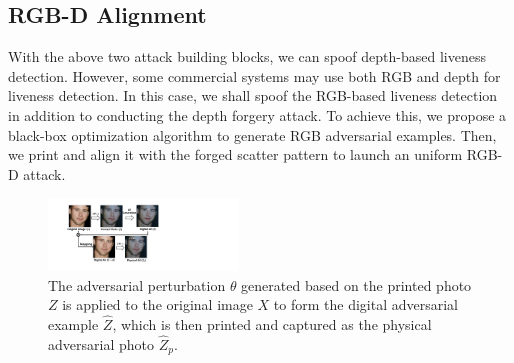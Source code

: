 \subsection{RGB-D Alignment}
With the above two attack building blocks, we can spoof depth-based liveness detection. However, some commercial systems may use both RGB and depth for liveness detection. In this case, we shall spoof the RGB-based liveness detection in addition to conducting the depth forgery attack. To achieve this, we propose a black-box optimization algorithm to generate  RGB adversarial examples. Then, we print  and  align it with the forged scatter pattern to launch an uniform RGB-D attack. 

\begin{figure}[!t]
	\centering
	\includegraphics[width=0.45\textwidth]{figures/adv_mapping.pdf} 
	\vspace{-0.1in}
	\caption{The adversarial perturbation $\theta$ generated based on the printed photo $Z$ is applied to the original image $X$ to form the digital adversarial example $\widehat{Z}$, which is then printed and captured as the physical adversarial photo $\widehat{Z}_p$.}
	\label{rgb_mapping}
	\vspace{-0.15in}
\end{figure}


